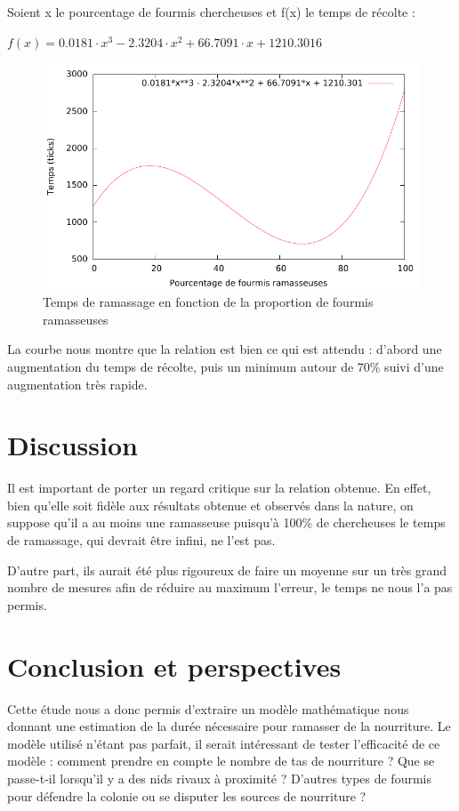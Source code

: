 \documentclass{article}
\begin{document}
Soient x le pourcentage de fourmis chercheuses et f(x) le temps de récolte :

\begin{math}
 f(x) = 0.0181\cdot x^3 - 2.3204\cdot x^2 + 66.7091\cdot x + 1210.3016
 \end{math}

\begin{figure}[H]
\centering
\includegraphics[scale=0.6]{avg.pdf}
\caption{Temps de ramassage en fonction de la proportion de fourmis ramasseuses}
\label{fig:relation}
\end{figure}

La courbe nous montre que la relation est bien ce qui est attendu : d'abord une augmentation du temps de récolte, puis un minimum autour de 70\% suivi d'une augmentation très rapide.
\section{Discussion}
Il est important de porter un regard critique sur la relation obtenue. En effet, bien qu'elle soit fidèle aux résultats obtenue et observés dans la nature, on suppose qu'il a au moins une ramasseuse puisqu'à 100\% de chercheuses le temps de ramassage, qui devrait être infini, ne l'est pas.

D'autre part, ils aurait été plus rigoureux de faire un moyenne sur un très grand nombre de mesures afin de réduire au maximum l'erreur, le temps ne nous l'a pas permis. 

\section*{Conclusion et perspectives}
Cette étude nous a donc permis d'extraire un modèle mathématique nous donnant une estimation de la durée nécessaire pour ramasser de la nourriture. Le modèle utilisé n'étant pas parfait, il serait intéressant de tester l'efficacité de ce modèle : comment prendre en compte le nombre de tas de nourriture ? Que se passe-t-il lorsqu'il y a des nids rivaux à proximité ? D'autres types de fourmis pour défendre la colonie ou se disputer les sources de nourriture ?
\end{document}
